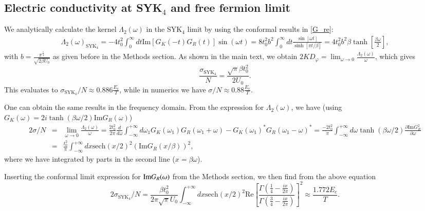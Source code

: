 \documentclass[twocolumn,floatfix,superscriptaddress]{revtex4-1}
\begin{document}
\begin{widetext}
 \subsection{Electric conductivity at SYK$_4$ and free fermion limit}
We analytically calculate the kernel $\Lambda_2(\omega)$ in the SYK$_4$ limit by using the conformal results in \eqref{G_re}:
\begin{eqnarray}
\Lambda_2(\omega)_{\text{SYK}_4}=-4t_0^2\int_0^{\infty} dt \text{Im}[G_K(-t)G_R(t)]\sin(\omega t)=8t_0^2b^2\int_0^\infty dt \frac{\sin[\omega t]}{\sinh[\pi t/\beta]}=4t_0^2b^2\beta\tanh[\frac{\beta\omega}{2}],
\end{eqnarray}
with $b=\frac{\pi^{\frac{1}{4}}}{\sqrt{2\beta U_0}}$ as given before
in the Methods section.  
As shown in the main text, we obtain $2KD_{\varphi} =
\lim_{\omega\rightarrow 0} \frac{\Lambda_2(\omega)}{\omega}$, which
gives
\begin{equation}
  \label{eq:3}
  \frac{\sigma_{\text{SYK}_4}}{N}=\frac{\sqrt {\pi}\beta t_0^2}{2 U_0}.
\end{equation}
This evaluates to $\sigma_{\text{SYK}_4}/N \approx 0.886\frac{E_c}{T}$, while in numerics we have $\sigma/N\approx 0.88 \frac{E_c}{T}$.

One can obtain the same results in the frequency domain.  From the expression for $\Lambda_2(\omega)$, we have (using $G_K(\omega)=2i\tanh(\beta\omega/2)\text{Im}G_R(\omega)$)
\begin{eqnarray}
\label{s22}
2\sigma/N&=&\lim_{\omega\rightarrow 0}\frac{\Lambda_2(\omega)}{\omega}=\frac{2t_0^2}{2\pi}\frac{d}{d\omega}\int_{-\infty}^{+\infty} d\omega_1 G_K(\omega_1)G_R(\omega_1+\omega)-G_K(\omega_1)^*G_R(\omega_1-\omega)^*=\frac{-2t_0^2}{\pi}\int_{-\infty}^{+\infty} d\omega \tanh(\beta\omega/2)\frac{\partial \text{Im}G_R^2}{\partial\omega}\nonumber\\
&=&\frac{t_0^2}{\pi}\int_{-\infty}^{+\infty} dx \text{sech}(x/2)^2 (\text{Im}G_R(x/\beta))^2,
\end{eqnarray}
where we have integrated by parts in the second line ($x=\beta \omega$).

Inserting the conformal limit expression for ${\rm Im} G_R(\omega)$
from the Methods section,
we then find from the above equation
\begin{equation}
2\sigma_{\text{SYK}_4}/N=\frac{\beta t_0^2}{2\pi \sqrt \pi U_0}\int_{-\infty}^{+\infty} dx \text{sech}(x/2)^2  \text{Re} [\frac{\Gamma(\frac{1}{4}-\frac{ix}{2\pi})}{\Gamma(\frac{3}{4}-\frac{ix}{2\pi})}]^2\approx \frac{1.772E_c}{T}.
\end{equation}


\end{widetext}
\end{document}
